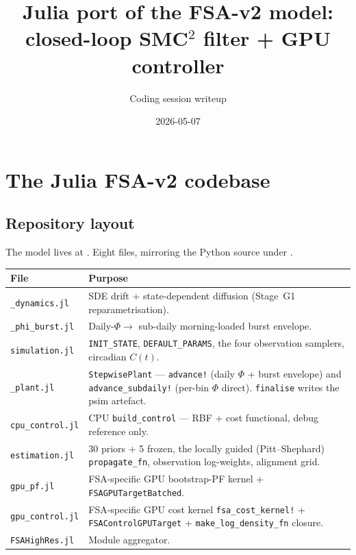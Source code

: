 \documentclass[11pt,a4paper]{article}
\title{Julia port of the FSA-v2 model:\\
  closed-loop SMC$^2$ filter + GPU controller}
\author{Coding session writeup}
\date{2026-05-07}
\begin{document}
\maketitle

\section{The Julia FSA-v2 codebase}
\label{sec:codebase}

\subsection{Repository layout}

The model lives at
. Eight files, mirroring
the Python source under .
\vspace{4pt}

\noindent
\begin{tabular}{@{}lp{}@{}}
\toprule
File & Purpose \\
\midrule
\texttt{\_dynamics.jl} & SDE drift + state-dependent diffusion (Stage~G1
                         reparametrisation). \\
\texttt{\_phi\_burst.jl} & Daily-$\Phi \to$ sub-daily morning-loaded
                          burst envelope. \\
\texttt{simulation.jl} & \texttt{INIT\_STATE}, \texttt{DEFAULT\_PARAMS},
                         the four observation samplers, circadian $C(t)$. \\
\texttt{\_plant.jl} & \texttt{StepwisePlant} — \texttt{advance!}
                     (daily $\Phi$ + burst envelope) and
                     \texttt{advance\_subdaily!} (per-bin $\Phi$ direct).
                     \texttt{finalise} writes the psim artefact. \\
\texttt{cpu\_control.jl} & CPU \texttt{build\_control} — RBF + cost
                          functional, debug reference only. \\
\texttt{estimation.jl} & 30 priors + 5 frozen, the locally guided
                          (Pitt--Shephard) \texttt{propagate\_fn},
                          observation log-weights, alignment grid. \\
\texttt{gpu\_pf.jl} & FSA-specific GPU bootstrap-PF kernel +
                     \texttt{FSAGPUTargetBatched}. \\
\texttt{gpu\_control.jl} & FSA-specific GPU cost kernel
                          \texttt{fsa\_cost\_kernel!} +
                          \texttt{FSAControlGPUTarget} +
                          \texttt{make\_log\_density\_fn} closure. \\
\texttt{FSAHighRes.jl} & Module aggregator. \\
\bottomrule
\end{tabular}
\end{document}
